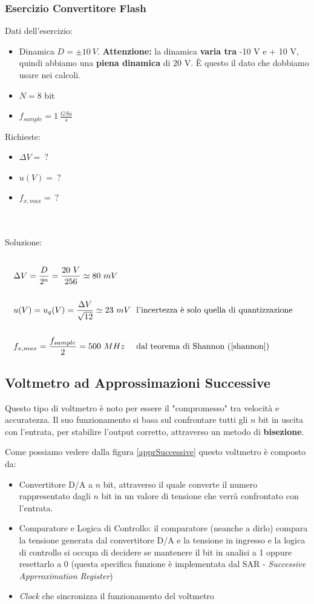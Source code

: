 \documentclass[a4paper,11pt]{report}
\begin{document}
\subsubsection{Esercizio Convertitore Flash}
Dati dell'esercizio:
\begin{itemize}
  \item Dinamica $ D = \pm 10~V$. \textbf{Attenzione:} la dinamica \textbf{varia tra} -10 V e + 10 V, quindi abbiamo una \textbf{piena dinamica} di 20 V. È questo il dato che dobbiamo usare nei calcoli.
  \item $ N = 8 $ bit
  \item $ f_{sample} = 1~\frac{GSa}{s} $
\end{itemize}
Richieste:
\begin{itemize}
  \item $ \Delta V =~? $
  \item $ u(V) =~? $
  \item $ f_{x,max} =~? $
\end{itemize}
~\\ \\
Soluzione:
\begin{align*}
  \\
  &\Delta V = \frac{D}{2^n} = \frac{20~V}{256} \simeq 80~mV\\
  \\
  &u(V) = u_q(V) = \frac{\Delta V}{\sqrt{12}} \simeq 23~mV\text{~~l'incertezza è solo quella di quantizzazione}\\
  \\
  &f_{x,max} = \frac{f_{sample}}{2} = 500~MHz \text{~~~ dal teorema di Shannon (\ref{shannon})}
\end{align*}
\newpage

\subsection{Voltmetro ad Approssimazioni Successive}
Questo tipo di voltmetro è noto per essere il "compromesso" tra velocità e accuratezza. Il suo funzionamento si basa sul confrontare tutti gli $ n $ bit in uscita con l'entrata, per stabilire l'output corretto, attraverso un metodo di \textbf{bisezione}.

Come possiamo vedere dalla figura \ref{apprSuccessive} questo voltmetro è composto da:
\begin{itemize}
  \item Convertitore D/A a $ n $ bit, attraverso il quale converte il numero rappresentato dagli $ n $ bit in un valore di tensione che verrà confrontato con l'entrata.
  \item Comparatore e Logica di Controllo: il comparatore (neanche a dirlo) compara la tensione generata dal convertitore D/A e la tensione in ingresso e la logica di controllo si occupa di decidere se mantenere il bit in analisi a 1 oppure resettarlo a 0 (questa specifica funzione è implementata dal SAR - \textit{Successive Apprroximation Register})
  \item \textit{Clock} che sincronizza il funzionamento del voltmetro
\end{itemize}
\end{document}
